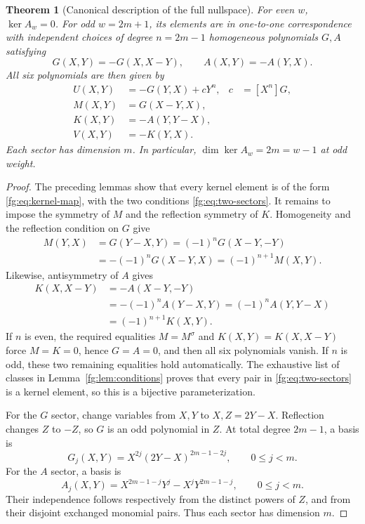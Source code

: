 \documentclass[11pt,a4paper]{article}
\newtheorem{theorem}{Theorem}[section]
\theoremstyle{definition}
\theoremstyle{remark}
\numberwithin{equation}{section}
\begin{document}
\begin{theorem}[Canonical description of the full nullspace]
\label{fg:thm:kernel}
For even $w$, $\ker A_w=0$. For odd $w=2m+1$, its elements are in
one-to-one correspondence with independent choices of degree
$n=2m-1$ homogeneous polynomials $G,A$ satisfying
\begin{equation}\label{fg:eq:two-sectors}
 G(X,Y)=-G(X,X-Y),\qquad A(X,Y)=-A(Y,X).
\end{equation}
All six polynomials are then given by
\begin{align}
 U(X,Y)&=-G(Y,X)+cY^n,&c&=[X^n]G,\\
 M(X,Y)&=G(X-Y,X),\\
 K(X,Y)&=-A(Y,Y-X),\\
 V(X,Y)&=-K(Y,X).
 \label{fg:eq:kernel-map}
\end{align}
Each sector has dimension $m$. In particular,
$\dim\ker A_w=2m=w-1$ at odd weight.
\end{theorem}
\begin{proof}
The preceding lemmas show that every kernel element is of the form
\eqref{fg:eq:kernel-map}, with the two conditions
\eqref{fg:eq:two-sectors}. It remains to impose the symmetry of $M$
and the reflection symmetry of $K$. Homogeneity and the reflection
condition on $G$ give
\begin{align*}
 M(Y,X)&=G(Y-X,Y)
       =(-1)^nG(X-Y,-Y)\\
       &=-(-1)^nG(X-Y,X)
        =(-1)^{n+1}M(X,Y).
\end{align*}
Likewise, antisymmetry of $A$ gives
\begin{align*}
 K(X,X-Y)&=-A(X-Y,-Y)\\
         &=-(-1)^nA(Y-X,Y)
          =(-1)^nA(Y,Y-X)\\
         &=(-1)^{n+1}K(X,Y).
\end{align*}
If $n$ is even, the required equalities $M=M^\sigma$ and
$K(X,Y)=K(X,X-Y)$ force $M=K=0$, hence $G=A=0$, and then all six
polynomials vanish. If $n$ is odd, these two remaining equalities
hold automatically. The exhaustive list of classes in
Lemma~\ref{fg:lem:conditions} proves that every pair in
\eqref{fg:eq:two-sectors} is a kernel element, so this is a bijective
parameterization.

For the $G$ sector, change variables from $X,Y$ to $X,Z=2Y-X$.
Reflection changes $Z$ to $-Z$, so $G$ is an odd polynomial in $Z$.
At total degree $2m-1$, a basis is
\begin{equation}\label{fg:eq:G-basis}
 G_j(X,Y)=X^{2j}(2Y-X)^{2m-1-2j},\qquad 0\le j<m.
\end{equation}
For the $A$ sector, a basis is
\begin{equation}\label{fg:eq:A-basis}
 A_j(X,Y)=X^{2m-1-j}Y^j-X^jY^{2m-1-j},\qquad 0\le j<m.
\end{equation}
Their independence follows respectively from the distinct powers of
$Z$, and from their disjoint exchanged monomial pairs. Thus each
sector has dimension $m$.
\end{proof}
\end{document}
